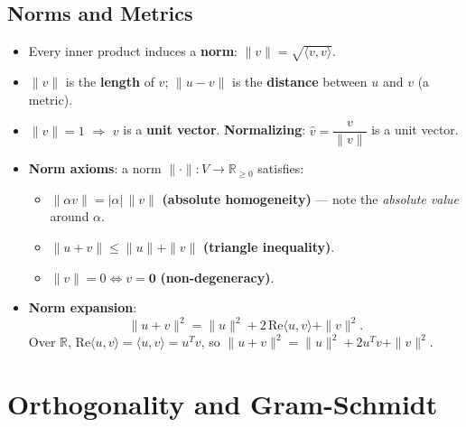 \documentclass[hidelinks]{article}
\begin{document}
\subsection{Norms and Metrics}
\begin{itemize}
    \item Every inner product induces a \textbf{norm}: $\|v\| = \sqrt{\langle v,v\rangle}$.
    \item $\|v\|$ is the \textbf{length} of $v$; $\|u-v\|$ is the \textbf{distance} between $u$ and $v$ (a metric).
    \item $\|v\|=1$ $\Rightarrow$ $v$ is a \textbf{unit vector}. \textbf{Normalizing}: $\hat{v} = \dfrac{v}{\|v\|}$ is a unit vector.
    \item \textbf{Norm axioms}: a norm $\|\cdot\|: V\rightarrow\mathbb{R}_{\geq 0}$ satisfies:
    \begin{itemize}
        \item $\|\alpha v\| = |\alpha|\,\|v\|$ \quad \textbf{(absolute homogeneity)} — note the \emph{absolute value} around $\alpha$.
        \item $\|u+v\| \leq \|u\| + \|v\|$ \quad \textbf{(triangle inequality)}.
        \item $\|v\| = 0 \iff v = \mathbf{0}$ \quad \textbf{(non-degeneracy)}.
    \end{itemize}
    \item \textbf{Norm expansion}:
    \[
        \|u+v\|^2 = \|u\|^2 + 2\,\mathrm{Re}\langle u,v\rangle + \|v\|^2.
    \]
    Over $\mathbb{R}$, $\mathrm{Re}\langle u,v\rangle = \langle u,v\rangle = u^T v$, so $\|u+v\|^2 = \|u\|^2 + 2u^Tv + \|v\|^2$.
\end{itemize}

\section{Orthogonality and Gram-Schmidt}
\end{document}
